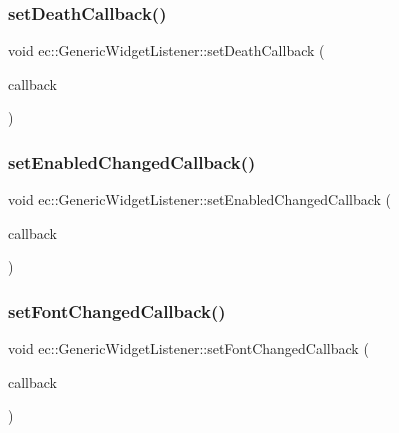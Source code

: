 \subsubsection{\texorpdfstring{set\+Death\+Callback()}{setDeathCallback()}}
{\footnotesize\ttfamily void ec\+::\+Generic\+Widget\+Listener\+::set\+Death\+Callback (\begin{DoxyParamCaption}\item[{const \mbox{\hyperlink{classec_1_1_generic_widget_listener_a9fbdf208fb605a8f9bcaf6f84246118f}{Death\+\_\+\+Callback}} \&}]{callback }\end{DoxyParamCaption})}

\mbox{\label{classec_1_1_generic_widget_listener_aa6e50d4202cfd4899ffb4d618750b8de}} 
\subsubsection{\texorpdfstring{set\+Enabled\+Changed\+Callback()}{setEnabledChangedCallback()}}
{\footnotesize\ttfamily void ec\+::\+Generic\+Widget\+Listener\+::set\+Enabled\+Changed\+Callback (\begin{DoxyParamCaption}\item[{const \mbox{\hyperlink{classec_1_1_generic_widget_listener_aa45e97274cfc832de2b027f94aeaa4c5}{Enabled\+Changed\+\_\+\+Callback}} \&}]{callback }\end{DoxyParamCaption})}

\mbox{\label{classec_1_1_generic_widget_listener_a1a6db5ae262a196f59ce44c542538205}} 
\subsubsection{\texorpdfstring{set\+Font\+Changed\+Callback()}{setFontChangedCallback()}}
{\footnotesize\ttfamily void ec\+::\+Generic\+Widget\+Listener\+::set\+Font\+Changed\+Callback (\begin{DoxyParamCaption}\item[{const \mbox{\hyperlink{classec_1_1_generic_widget_listener_a996d1f52cd8a7b2b68b65956df295fe4}{Font\+Changed\+\_\+\+Callback}} \&}]{callback }\end{DoxyParamCaption})}

